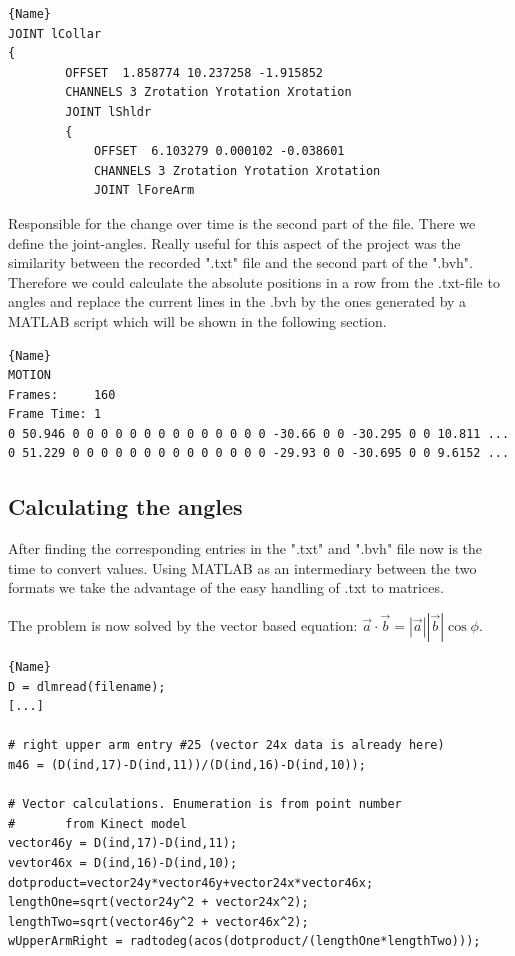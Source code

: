 \documentclass[a4paper]{article}
\begin{document}
\begin{lstlisting}[caption=.bvh Connected Structure. TODO: MORE TEXT!]{Name}
JOINT lCollar
{
		OFFSET	1.858774 10.237258 -1.915852
		CHANNELS 3 Zrotation Yrotation Xrotation
		JOINT lShldr
		{
			OFFSET	6.103279 0.000102 -0.038601
			CHANNELS 3 Zrotation Yrotation Xrotation
			JOINT lForeArm
\end{lstlisting}

Responsible for the change over time is the second part of the file.
There we define the joint-angles.
Really useful for this aspect of the project was the similarity between the recorded ".txt" file and the second part of the ".bvh".
Therefore we could calculate the absolute positions in a row from the .txt-file to angles and replace the current lines in the .bvh by the ones generated by a MATLAB script which will be shown in the following section.

\begin{lstlisting}[caption=Motionpart of .bvh. TODO: MORE TEXT!]{Name}
MOTION
Frames:     160
Frame Time: 1                
0 50.946 0 0 0 0 0 0 0 0 0 0 0 0 0 0 -30.66 0 0 -30.295 0 0 10.811 ...
0 51.229 0 0 0 0 0 0 0 0 0 0 0 0 0 0 -29.93 0 0 -30.695 0 0 9.6152 ...
\end{lstlisting}

\subsection{Calculating the angles}

After finding the corresponding entries in the ".txt" and ".bvh" file now is the time to convert values.
Using MATLAB as an intermediary between the two formats we take the advantage of the easy handling of .txt to matrices.

The problem is now solved by the vector based equation: $\vec a \cdot \vec b = \left|\vec a \right| \left|\vec b \right| \cos \phi$.

\begin{lstlisting}[caption=Calculating the angle. TODO: MORE TEXT!]{Name}
D = dlmread(filename);
[...]

# right upper arm entry #25 (vector 24x data is already here)
m46 = (D(ind,17)-D(ind,11))/(D(ind,16)-D(ind,10));

# Vector calculations. Enumeration is from point number
#       from Kinect model
vector46y = D(ind,17)-D(ind,11);
vevtor46x = D(ind,16)-D(ind,10);
dotproduct=vector24y*vector46y+vector24x*vector46x;
lengthOne=sqrt(vector24y^2 + vector24x^2);
lengthTwo=sqrt(vector46y^2 + vector46x^2); 
wUpperArmRight = radtodeg(acos(dotproduct/(lengthOne*lengthTwo)));
\end{lstlisting}
\end{document}
